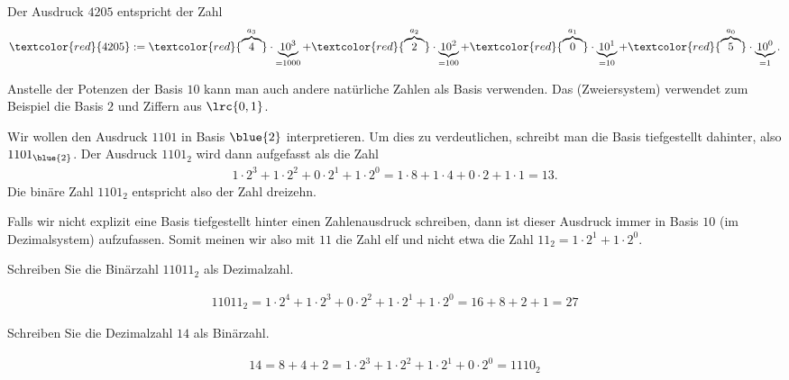 \begin{myexample}
Der Ausdruck $4205$ entspricht der Zahl
\begin{align*}
	\textcolor{red}{4205} := \textcolor{red}{\overbrace{4}^{a_3}}\cdot \underbrace{10^3}_{=1000} + \textcolor{red}{\overbrace{2}^{a_2}}\cdot \underbrace{10^2}_{=100} + \textcolor{red}{\overbrace{0}^{a_1}}\cdot \underbrace{10^1}_{=10} + \textcolor{red}{\overbrace{5}^{a_0}}\cdot \underbrace{10^0}_{=1}.
\end{align*}
\end{myexample}

Anstelle der Potenzen der Basis $10$ kann man auch andere natürliche Zahlen als Basis verwenden.
Das  (Zweiersystem) verwendet zum Beispiel die Basis $2$ und
Ziffern aus $\lrc{0,1}$.
\begin{myexample}
Wir wollen den Ausdruck $1101$ in Basis $\blue{2}$ interpretieren. Um dies zu verdeutlichen, schreibt man die Basis
tiefgestellt dahinter, also $1101_{\blue{2}}$. Der Ausdruck $1101_2$ wird dann aufgefasst als die Zahl
\begin{align*}
	1\cdot 2^3 + 1\cdot 2^2 + 0\cdot 2^1 + 1\cdot 2^0 = 1\cdot 8 + 1\cdot 4 + 0\cdot 2 + 1\cdot 1 = 13.
\end{align*}
Die binäre Zahl $1101_2$ entspricht also der Zahl dreizehn.
\end{myexample}

\begin{myattention}
	Falls wir nicht explizit eine Basis tiefgestellt hinter einen Zahlenausdruck schreiben, dann ist dieser Ausdruck immer in Basis $10$ (im
	Dezimalsystem) aufzufassen. Somit meinen wir also mit $11$ die Zahl elf und nicht etwa die Zahl $11_2 = 1\cdot 2^1 +
		1\cdot 2^0$.
\end{myattention}

\begin{myexercise}
	Schreiben Sie die Binärzahl $11011_2$ als Dezimalzahl.
	\begin{myanswer}
		\begin{align*}
			11011_2 = 1\cdot 2^4 + 1\cdot 2^3 + 0\cdot 2^2 + 1\cdot 2^1 + 1\cdot 2^0 = 16 + 8 + 2 + 1 = 27
		\end{align*}
	\end{myanswer}
\end{myexercise}

\begin{myexercise}
	Schreiben Sie die Dezimalzahl $14$ als Binärzahl.
	\begin{myanswer}
		\begin{align*}
			14 = 8 + 4 + 2 = 1\cdot 2^3 + 1\cdot 2^2 + 1\cdot 2^1 + 0\cdot 2^0 = 1110_2
		\end{align*}
	\end{myanswer}
\end{myexercise}

